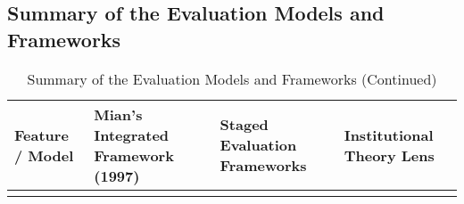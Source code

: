\documentclass[../Main.tex]{subfiles}
\begin{document}
\subsection{Summary of the Evaluation Models and Frameworks}

\begin{longtable}{|p{}|p{}|p{}|p{}|}
    \caption{Summary of the Evaluation Models and Frameworks}
    \label{tab:evaluation-models-frameworks}                                                                                                                                                                                                                                                                                                                                                                                                                                                                                                                                                                                                                                                                                                                        \\
    \hline
    \textbf{Feature / Model}    & \textbf{Mian's Integrated Framework (1997)}                                                                                                             & \textbf{Staged Evaluation Frameworks}                                                                                                                             & \textbf{Institutional Theory Lens}                                                                                                   \\
    \hline
    \endfirsthead
    \caption[]{Summary of the Evaluation Models and Frameworks (Continued)}                                                                                                                                                                                                                                                                                                                                                                                                                                                                                                                                                                                                                                                                                         \\
    \hline

\end{longtable}
\end{document}
